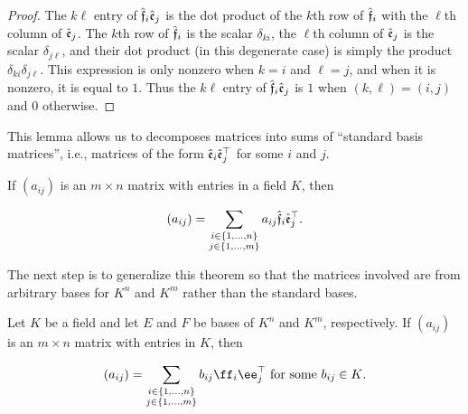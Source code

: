 \begin{proof}
    The $k\ell$ entry of $\hat{\mathfrak{f}}_i \hat{\mathfrak{e}}_j$ is the dot product of the $k$th row of $\hat{\mathfrak{f}}_i$ with the $\ell$th column of $\hat{\mathfrak{e}}_j$. The $k$th row of $\hat{\mathfrak{f}}_i$ is the scalar $\delta_{ki}$, the $\ell$th column of $\hat{\mathfrak{e}}_j$ is the scalar $\delta_{j\ell}$, and their dot product (in this degenerate case) is simply the product $\delta_{ki} \delta_{j \ell}$. This expression is only nonzero when $k = i$ and $\ell = j$, and when it is nonzero, it is equal to $1$. Thus the $k\ell$ entry of $\hat{\mathfrak{f}}_i \hat{\mathfrak{e}}_j$ is $1$ when $(k, \ell) = (i, j)$ and $0$ otherwise.
\end{proof}

This lemma allows us to decomposes matrices into sums of ``standard basis matrices'', i.e., matrices of the form $\hat{\mathfrak{e}}_i \hat{\mathfrak{e}}_j^\top$ for some $i$ and $j$.

\begin{theorem}
    If $(a_{ij})$ is an $m \times n$ matrix with entries in a field $K$, then

    \begin{align*}
        (a_{ij}) = \sum_{\substack{i \in \{1, ..., n\} \\ j \in \{1, ..., m\}}} a_{ij} \hat{\mathfrak{f}}_i \hat{\mathfrak{e}}_j^\top.
    \end{align*}
\end{theorem}

The next step is to generalize this theorem so that the matrices involved are from arbitrary bases for $K^n$ and $K^m$ rather than the standard bases.

\begin{theorem}
    Let $K$ be a field and let $E$ and $F$ be bases of $K^n$ and $K^m$, respectively. If $(a_{ij})$ is an $m \times n$ matrix with entries in $K$, then

   \begin{align*}
        (a_{ij}) = \sum_{\substack{i \in \{1, ..., n\} \\ j \in \{1, ..., m\}}} b_{ij} \ff_i \ee_j^\top \text{ for some $b_{ij} \in K$}.
    \end{align*}
\end{theorem}

